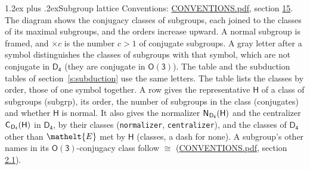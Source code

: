 \documentclass[10pt,a4paper]{article}
\makeatletter
\renewcommand\section{\@startsection{section}{1}{\z@}{-3ex plus -1ex minus -.2ex}%
  {1.2ex plus .2ex}{\normalfont\large\sffamily\bfseries\color{parttitle}}}
\numberwithin{equation}{section}
\newcommand{\eltfont}[1]{{\let\sigma\eltsigma\mathelt{#1}}}
\newcommand{\grp}[1]{\mathsf{#1}}
\newcommand{\cls}[1]{\eltfont{#1}}
\newcommand{\samecls}{\cong}
\newcommand{\nconj}[1]{{\scriptsize$\times#1$}}
\newcommand{\clsletter}[1]{\,{\scriptsize\color{black!55}#1}}
\newcommand{\hairsp}{\mkern1mu}
\makeatother
\begin{document}
\section{Subgroup lattice}\label{s:subgroups}
Conventions: \href{../../CONVENTIONS.pdf}{CONVENTIONS.pdf}, section \href{../../CONVENTIONS.pdf\#conv.15}{15}.
The diagram shows the conjugacy classes of subgroups, each joined to the classes of its maximal subgroups, and the orders increase upward. A normal subgroup is framed, and ${\times}c$ is the number $c > 1$ of conjugate subgroups. A gray letter after a symbol distinguishes the classes of subgroups with that symbol, which are not conjugate in $\grp{D_{4}}$ (they are conjugate in \href{O3.pdf}{$\grp{O(3)}$}). The table and the subduction tables of section~\ref{s:subduction} use the same letters. The table lists the classes by order, those of one symbol together. \label{n:group.H}\label{n:head.subgroup}\label{n:head.order}\label{n:head.conjugates}\label{n:head.normal}A row gives the representative $\grp{H}$ of a class of subgroups (subgrp), its order, the number of subgroups in the class (conjugates) and whether $\grp{H}$ is normal. \label{n:group.normalizer}\label{n:group.centralizer}\label{n:head.classes}It also gives the normalizer $\grp{N}_{\hairsp \grp{D_{4}}}(\grp{H})$ and the centralizer $\grp{C}_{\hairsp \grp{D_{4}}}(\grp{H})$ in $\grp{D_{4}}$, by their classes (\texttt{normalizer}, \texttt{centralizer}), and the classes of $\grp{D_{4}}$ other than $\cls{E}$ met by $\grp{H}$ (classes, a dash for none). A subgroup's other names in its \href{O3.pdf}{$\grp{O(3)}$}-conjugacy class follow $\samecls$ (\href{../../CONVENTIONS.pdf}{CONVENTIONS.pdf}, section \href{../../CONVENTIONS.pdf\#conv.2.1}{2.1}).
\begin{center}
\end{center}
\end{document}
